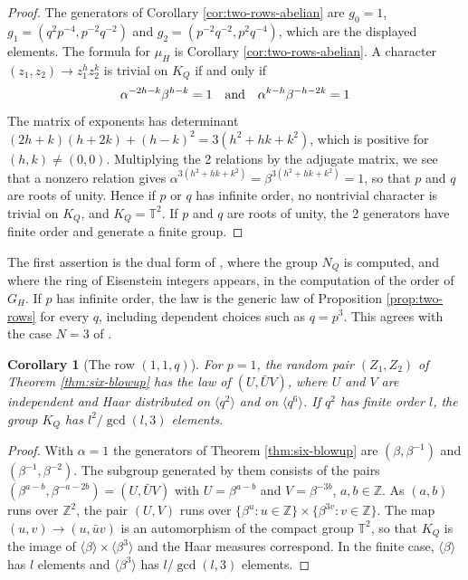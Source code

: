 \documentclass[11pt,reqno]{amsart}
\newtheorem{cor}[thm]{Corollary}
\theoremstyle{definition}
\numberwithin{equation}{section}
\begin{document}
\begin{proof}
The generators of Corollary \ref{cor:two-rows-abelian} are $g_0=1$, $g_1=(q^2p^{-4},p^{-2}q^{-2})$ and $g_2=(p^{-2}q^{-2},p^2q^{-4})$, which are the displayed elements. The formula for $\mu_H$ is Corollary \ref{cor:two-rows-abelian}. A character $(z_1,z_2)\to z_1^hz_2^k$ is trivial on $K_Q$ if and only if
$$\alpha^{-2h-k}\beta^{h-k}=1
\quad{\rm and}\quad
\alpha^{k-h}\beta^{-h-2k}=1$$
The matrix of exponents has determinant $(2h+k)(h+2k)+(h-k)^2=3(h^2+hk+k^2)$, which is positive for $(h,k)\neq(0,0)$. Multiplying the 2 relations by the adjugate matrix, we see that a nonzero relation gives $\alpha^{3(h^2+hk+k^2)}=\beta^{3(h^2+hk+k^2)}=1$, so that $p$ and $q$ are roots of unity. Hence if $p$ or $q$ has infinite order, no nontrivial character is trivial on $K_Q$, and $K_Q=\mathbb T^2$. If $p$ and $q$ are roots of unity, the 2 generators have finite order and generate a finite group.
\end{proof}

The first assertion is the dual form of \cite[Theorem 4.6]{BO26}, where the group $N_Q$ is computed, and where the ring of Eisenstein integers appears, in the computation of the order of $G_H$. If $p$ has infinite order, the law is the generic law of Proposition \ref{prop:two-rows} for every $q$, including dependent choices such as $q=p^3$. This agrees with the case $N=3$ of \cite[Theorem 5.1]{Bic15}.

\begin{cor}[The row $(1,1,q)$]\label{cor:six-one-phase}
For $p=1$, the random pair $(Z_1,Z_2)$ of Theorem \ref{thm:six-blowup} has the law of $(U,\bar UV)$, where $U$ and $V$ are independent and Haar distributed on $\langle q^2\rangle$ and on $\langle q^6\rangle$. If $q^2$ has finite order $l$, the group $K_Q$ has $l^2/\gcd(l,3)$ elements.
\end{cor}

\begin{proof}
With $\alpha=1$ the generators of Theorem \ref{thm:six-blowup} are $(\beta,\beta^{-1})$ and $(\beta^{-1},\beta^{-2})$. The subgroup generated by them consists of the pairs $(\beta^{a-b},\beta^{-a-2b})=(U,\bar UV)$ with $U=\beta^{a-b}$ and $V=\beta^{-3b}$, $a,b\in\mathbb Z$. As $(a,b)$ runs over $\mathbb Z^2$, the pair $(U,V)$ runs over $\{\beta^u:u\in\mathbb Z\}\times\{\beta^{3v}:v\in\mathbb Z\}$. The map $(u,v)\to(u,\bar uv)$ is an automorphism of the compact group $\mathbb T^2$, so that $K_Q$ is the image of $\langle\beta\rangle\times\langle\beta^3\rangle$ and the Haar measures correspond. In the finite case, $\langle\beta\rangle$ has $l$ elements and $\langle\beta^3\rangle$ has $l/\gcd(l,3)$ elements.
\end{proof}
\end{document}
